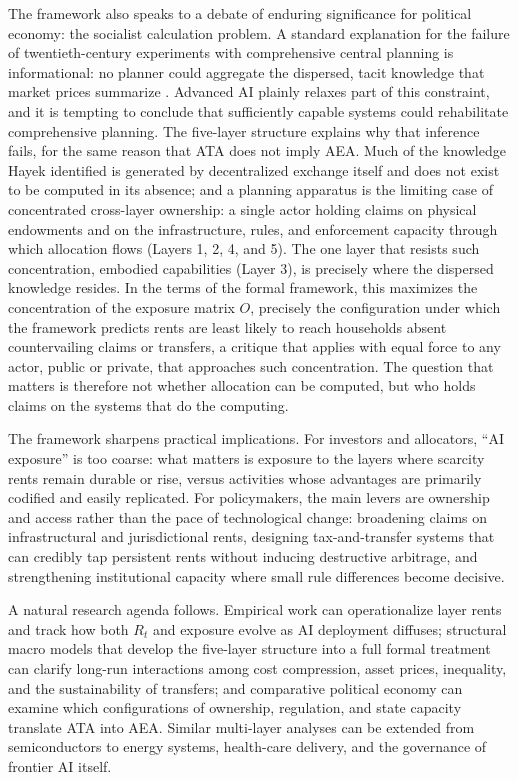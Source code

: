 \documentclass[11pt]{article}
\begin{document}
The framework also speaks to a debate of enduring significance for political economy: the socialist calculation problem. A standard explanation for the failure of twentieth-century experiments with comprehensive central planning is informational: no planner could aggregate the dispersed, tacit knowledge that market prices summarize \citep{Hayek1945}. Advanced AI plainly relaxes part of this constraint, and it is tempting to conclude that sufficiently capable systems could rehabilitate comprehensive planning. The five-layer structure explains why that inference fails, for the same reason that ATA does not imply AEA. Much of the knowledge Hayek identified is generated by decentralized exchange itself and does not exist to be computed in its absence; and a planning apparatus is the limiting case of concentrated cross-layer ownership: a single actor holding claims on physical endowments and on the infrastructure, rules, and enforcement capacity through which allocation flows (Layers 1, 2, 4, and 5). The one layer that resists such concentration, embodied capabilities (Layer 3), is precisely where the dispersed knowledge resides. In the terms of the formal framework, this maximizes the concentration of the exposure matrix \(O\), precisely the configuration under which the framework predicts rents are least likely to reach households absent countervailing claims or transfers, a critique that applies with equal force to any actor, public or private, that approaches such concentration. The question that matters is therefore not whether allocation can be computed, but who holds claims on the systems that do the computing.

The framework sharpens practical implications. For investors and allocators, ``AI exposure'' is too coarse: what matters is exposure to the layers where scarcity rents remain durable or rise, versus activities whose advantages are primarily codified and easily replicated. For policymakers, the main levers are ownership and access rather than the pace of technological change: broadening claims on infrastructural and jurisdictional rents, designing tax-and-transfer systems that can credibly tap persistent rents without inducing destructive arbitrage, and strengthening institutional capacity where small rule differences become decisive.

A natural research agenda follows. Empirical work can operationalize layer rents and track how both \(R_t\) and exposure evolve as AI deployment diffuses; structural macro models that develop the five-layer structure into a full formal treatment can clarify long-run interactions among cost compression, asset prices, inequality, and the sustainability of transfers; and comparative political economy can examine which configurations of ownership, regulation, and state capacity translate ATA into AEA. Similar multi-layer analyses can be extended from semiconductors to energy systems, health-care delivery, and the governance of frontier AI itself.
\end{document}
